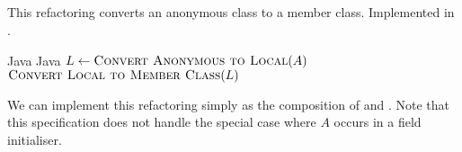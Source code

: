 \subsection{}
This refactoring converts an anonymous class to a member class. Implemented in .

\begin{algorithm}
\caption{$\refactoring{Convert Anonymous to Nested}(A : \type{AnonymousClass}) : \type{MemberType}$}
\begin{algorithmic}[1]
\REQUIRE Java
\ENSURE Java
\medskip
\STATE $L \leftarrow \textsc{Convert Anonymous to Local}(A)$
\RETURN $\textsc{Convert Local to Member Class}(L)$
\end{algorithmic}
\end{algorithm}

We can implement this refactoring simply as the composition of  and . Note that this specification does not handle the special case where $A$ occurs in a field initialiser.
